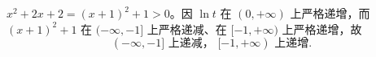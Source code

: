 $x^2+2x+2=(x+1)^2+1>0$。因 $\ln t$ 在 $(0,+\infty)$ 上严格递增，而 $(x+1)^2+1$ 在 $(-\infty,-1]$ 上严格递减、在 $[-1,+\infty)$ 上严格递增，故
\[
\boxed{(-\infty,-1]\text{ 上递减， }[-1,+\infty)\text{ 上递增}.}
\]
